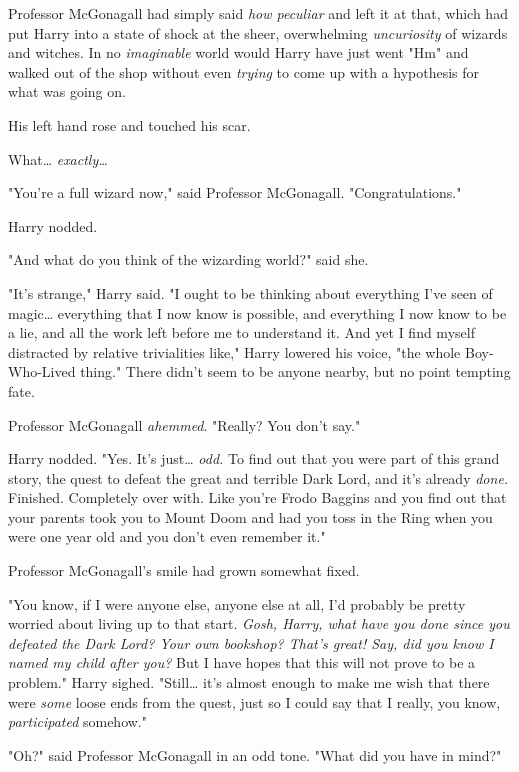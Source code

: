 Professor McGonagall had simply said \emph{how peculiar} and left it at that, 
which had put Harry into a state of shock at the sheer, overwhelming 
\emph{uncuriosity} of wizards and witches. In no \emph{imaginable} world would 
Harry have just went "Hm" and walked out of the shop without even \emph{trying} 
to come up with a hypothesis for what was going on.

His left hand rose and touched his scar.

What{\ldots} \emph{exactly{\ldots}}

"You're a full wizard now," said Professor McGonagall. "Congratulations."

Harry nodded.

"And what do you think of the wizarding world?" said she.

"It's strange," Harry said. "I ought to be thinking about everything I've seen 
of magic{\ldots} everything that I now know is possible, and everything I now 
know to be a lie, and all the work left before me to understand it. And yet I 
find myself distracted by relative trivialities like," Harry lowered his voice, 
"the whole Boy-Who-Lived thing." There didn't seem to be anyone nearby, but no 
point tempting fate.

Professor McGonagall \emph{ahemmed}. "Really? You don't say."

Harry nodded. "Yes. It's just{\ldots} \emph{odd.} To find out that you were 
part of this grand story, the quest to defeat the great and terrible Dark Lord, 
and it's already \emph{done.} Finished. Completely over with. Like you're Frodo 
Baggins and you find out that your parents took you to Mount Doom and had you 
toss in the Ring when you were one year old and you don't even remember it."

Professor McGonagall's smile had grown somewhat fixed.

"You know, if I were anyone else, anyone else at all, I'd probably be pretty 
worried about living up to that start. \emph{Gosh, Harry, what have you done 
since you defeated the Dark Lord? Your own bookshop? That's great! Say, did you 
know I named my child after you?} But I have hopes that this will not prove to 
be a problem." Harry sighed. "Still{\ldots} it's almost enough to make me wish 
that there were \emph{some} loose ends from the quest, just so I could say that 
I really, you know, \emph{participated} somehow."

"Oh?" said Professor McGonagall in an odd tone. "What did you have in mind?"

